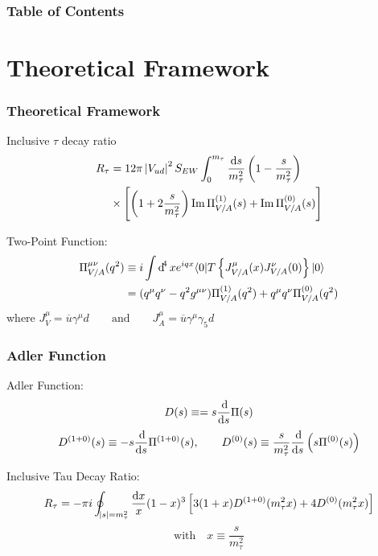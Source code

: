 \documentclass[fleqn]{beamer}
\DeclareMathOperator{\Ima}{Im}
\begin{document}
\begin{frame}
  \frametitle{Table of Contents}
  \tableofcontents
\end{frame} 

\section{Theoretical Framework}
\begin{frame}
  \frametitle{Theoretical Framework}
  \begin{block}{Inclusive \(\tau\) decay ratio}
    \vspace*{-\baselineskip}\setlength\belowdisplayshortskip{0pt}
    \begin{equation}
      \begin{split}
        R_\tau &= 12 \pi \,\abs{V_{ud}}^2 S_{EW} \int_0^{m_\tau} \frac{\dif s}{m_\tau^2} \left( 1 - \frac{s}{m_\tau^2} \right) \\
        &\times \left[ \left( 1 + 2 \frac{s}{m_\tau^2} \right) \Ima \Pi_{V/A}^{(1)}(s) + \Ima \Pi_{V/A}^{(0)}(s) \right]
      \end{split}
    \end{equation}
  \end{block}
  
  \pause

  \vspace{0.5cm}

  Two-Point Function:
  \begin{equation}
    \begin{split}
    \Pi_{V/A}^{\mu\nu}(q^2) &\equiv i \int \dif^4 x e^{iqx} \langle 0\vert T \left\{ J_{V/A}^\mu(x) J_{V/A}^\nu(0)\right\} \vert 0 \rangle \\
    &= (q^\mu q^\nu - q^2 g^{\mu\nu})\Pi_{V/A}^{(1)}(q^2) + q^\mu q^\nu \Pi_{V/A}^{(0)}(q^2)
    \end{split}
  \end{equation}
  \small
  where \(J_V^\mu = \overline{u} \gamma^\mu d \qquad \text{and} \qquad J_A^\mu = \overline{u} \gamma^\mu \gamma_5 d\)
\end{frame}
\begin{frame}
  \frametitle{Adler Function}
  Adler Function:
  \begin{equation}
    D(s) \equiv =s \frac{\dif}{\dif s} \Pi(s)
  \end{equation}
  \begin{equation}
    D^{(1+0)}(s) \equiv -s \frac{\dif}{\dif s} \Pi^{(1+0)}(s), \qquad D^{(0)}(s) \equiv \frac{s}{m_\tau^2} \frac{\dif}{\dif s} \left( s \Pi^{(0)}(s) \right)
  \end{equation}

  \pause
  
  Inclusive Tau Decay Ratio:
  \begin{equation}
    R_\tau = - \pi i \oint_{\abs{s}=m_\tau^2} \frac{\dif x}{x}(1-x)^3 \left[ 3(1+x)D^{(1+0)}(m_\tau^2x) + 4 D^{(0)}(m_\tau^2 x) \right]
  \end{equation}
  \small
  \begin{equation*}
    \text{with} \quad x \equiv \frac{s}{m_\tau^2}
  \end{equation*} 
\end{frame}
\end{document}
